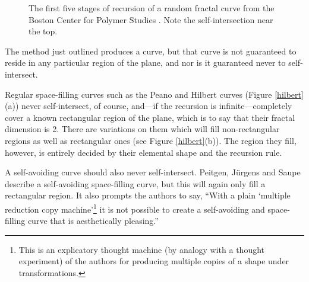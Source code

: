 \documentclass[12pt]{article}
\begin{document}
\begin{figure}[h!]
 \begin{center} 
  \parbox{110mm}{\caption{\label{r-frac} The first five stages of
      recursion of a random fractal curve from the Boston Center for
      Polymer Studies \cite{boston-cps}.  Note the self-intersection
      near the top.}}
\end{center}
\end{figure}

The method just outlined produces a curve, but that curve is not
guaranteed to reside in any particular region of the plane, and nor is
it guaranteed never to self-intersect.  

Regular space-filling curves such as the Peano \cite{peano-orig} and
Hilbert \cite{hilbert-orig} curves (Figure \ref{hilbert}(a)) never
self-intersect, of course, and---if the recursion is
infinite---completely cover a known rectangular region of the plane,
which is to say that their fractal dimension \cite{mb2} is 2.  There
are variations on them which will fill non-rectangular regions as well
as rectangular ones (see Figure \ref{hilbert}(b)).  The region they
fill, however, is entirely decided by their elemental shape and the
recursion rule.

A self-avoiding curve should also never self-intersect.  Peitgen,
J\"{u}rgens and Saupe \cite{peitgen} describe a self-avoiding
space-filling curve, but this will again only fill a rectangular
region.  It also prompts the authors to say, ``With a plain `multiple
reduction copy machine'\footnote{This is an explicatory thought
machine (by analogy with a thought experiment) of the authors for
producing multiple copies of a shape under transformations.} it is not
possible to create a self-avoiding and space-filling curve that is
aesthetically pleasing.''
\end{document}
